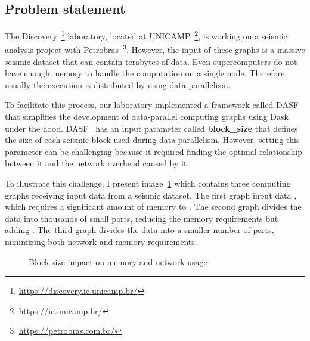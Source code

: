 \subsection{Problem statement}
\label{subsec:problem-statement}

The Discovery~\footnote{\url{https://discovery.ic.unicamp.br/}} laboratory, located at \ac{UNICAMP}~\footnote{\url{https://ic.unicamp.br/}}, is working on a seismic analysis project with Petrobras~\footnote{\url{https://petrobras.com.br/}}.
However, the input of these graphs is a massive seismic dataset that can contain terabytes of data.
Even supercomputers do not have enough memory to handle the computation on a single node.
Therefore, usually the execution is distributed by using data parallelism.

To facilitate this process, our laboratory implemented a framework called \ac{DASF}~\cite{dasf} that simplifies the development of data-parallel computing graphs using Dask~\cite{dask} under the hood.
\ac{DASF}~\cite{dasf} has an input parameter called \textbf{block\_size} that defines the size of each seismic block used during data parallelism.
However, setting this parameter can be challenging because it required finding the optimal relationship between it and the network overhead caused by it.

To illustrate this challenge, I present image~\ref{fig:block-size} which contains three computing graphs receiving input data from a seismic dataset.
The first graph  input data , which requires a significant amount of memory to .
The second graph divides the data into thousands of small parts, reducing the memory requirements but adding .
The third graph divides the data into a smaller number of parts, minimizing both network and memory requirements.

\begin{figure}[ht]
  \caption{Block size impact on memory and network usage}
  \label{fig:block-size}
\end{figure}

